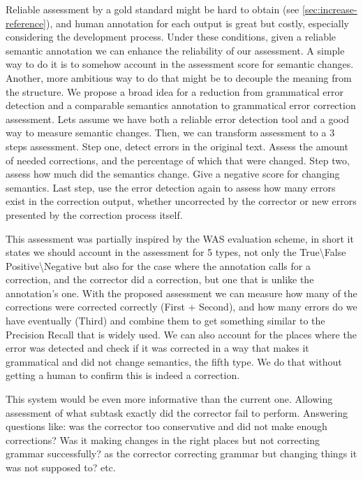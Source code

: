 \documentclass[letter,11pt]{article}
\begin{document}
Reliable assessment by a gold standard might be hard to obtain (see
\ref{sec:increase-reference}), and human annotation for each output
is great \cite{madnani2011they} but costly, especially considering the
development process. Under these conditions,
given a reliable semantic annotation we can enhance the reliability of our assessment. A simple way to do it is to somehow account in the assessment score for semantic changes. 
Another, more ambitious way to do that might be to decouple the meaning
from the structure. We propose a broad idea for a reduction from grammatical
error detection and a comparable semantics annotation to grammatical
error correction assessment. Lets assume we have both a reliable error
detection tool and a good way to measure semantic changes. Then, we
can transform assessment to a 3 steps assessment. 
Step one, detect errors in the original text. Assess the amount of needed corrections, and the percentage of which that were changed.
Step two, assess how much did the semantics change.
 Give a negative score for changing semantics.
Last step, use
the error detection again to assess how many errors exist in the correction
output, whether uncorrected by the corrector or new errors presented
by the correction process itself. 

This assessment was partially inspired by the WAS evaluation scheme\cite{chodorow2012problems},
in short it states we should account in the assessment for 5 types,
not only the True\textbackslash{}False Positive\textbackslash{}Negative
but also for the case where the annotation calls for a correction,
and the corrector did a correction, but one that is unlike the annotation's
one. With the proposed assessment we can measure how many of the corrections
were corrected correctly (First + Second), and how many errors do
we have eventually (Third) and combine them to get something similar
to the Precision Recall that is widely used. We can also account for
the places where the error was detected and check if it was corrected
in a way that makes it grammatical and did not change semantics, the
fifth type. We do that without getting a human to confirm this is
indeed a correction.

This system would be even more informative than the current one. Allowing assessment of
what subtask exactly did the corrector fail to perform. Answering questions
like: was the corrector too conservative and did not make enough corrections?
Was it making changes in the right places but not correcting grammar successfully?
 as the corrector correcting grammar but changing things
it was not supposed to? etc.
\end{document}
